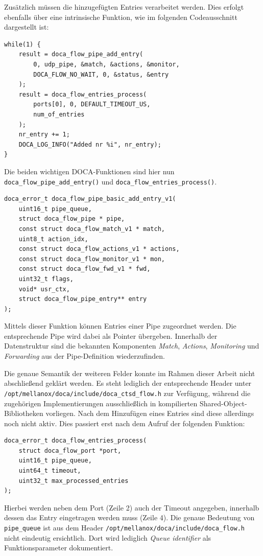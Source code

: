 \documentclass[paper=a4, fontsize=11pt]{scrartcl} %
\numberwithin{equation}{section} %
\numberwithin{figure}{section} %
\numberwithin{table}{section} %
\begin{document}
Zusätzlich müssen die hinzugefügten Entries verarbeitet werden. Dies erfolgt ebenfalls über eine intrinsische Funktion, wie im folgenden Codeausschnitt dargestellt ist:
\begin{verbatim}
while(1) {
    result = doca_flow_pipe_add_entry(
        0, udp_pipe, &match, &actions, &monitor, 
        DOCA_FLOW_NO_WAIT, 0, &status, &entry
    );
    result = doca_flow_entries_process(
        ports[0], 0, DEFAULT_TIMEOUT_US, 
        num_of_entries
    );
    nr_entry += 1;
    DOCA_LOG_INFO("Added nr %i", nr_entry);
}
\end{verbatim}
Die beiden wichtigen DOCA-Funktionen sind hier nun \texttt{doca\_flow\_pipe\_add\_entry()} und \texttt{doca\_flow\_entries\_process()}.
\begin{verbatim}
doca_error_t doca_flow_pipe_basic_add_entry_v1(
    uint16_t pipe_queue, 
    struct doca_flow_pipe * pipe, 
    const struct doca_flow_match_v1 * match, 
    uint8_t action_idx, 
    const struct doca_flow_actions_v1 * actions, 
    const struct doca_flow_monitor_v1 * mon, 
    const struct doca_flow_fwd_v1 * fwd, 
    uint32_t flags, 
    void* usr_ctx, 
    struct doca_flow_pipe_entry** entry
);
\end{verbatim}
Mittels dieser Funktion können Entries einer Pipe zugeordnet werden. Die entsprechende Pipe wird dabei als Pointer übergeben. Innerhalb der Datenstruktur sind die bekannten Komponenten \textit{Match}, \textit{Actions}, \textit{Monitoring} und \textit{Forwarding} aus der Pipe-Definition wiederzufinden.

Die genaue Semantik der weiteren Felder konnte im Rahmen dieser Arbeit nicht abschließend geklärt werden. Es steht lediglich der entsprechende Header unter \newline \texttt{/opt/mellanox/doca/include/doca\_ctsd\_flow.h} zur Verfügung, während die zugehörigen Implementierungen ausschließlich in kompilierten Shared-Object-Bibliotheken vorliegen.
\newpage
Nach dem Hinzufügen eines Entries sind diese allerdings noch nicht aktiv. Dies passiert erst nach dem Aufruf der folgenden Funktion:
\begin{verbatim}
doca_error_t doca_flow_entries_process(
    struct doca_flow_port *port,
    uint16_t pipe_queue,
    uint64_t timeout,
    uint32_t max_processed_entries
);
\end{verbatim}
Hierbei werden neben dem Port (Zeile 2) auch der Timeout angegeben, innerhalb dessen das Entry eingetragen werden muss (Zeile 4). Die genaue Bedeutung von \texttt{pipe\_queue} ist aus dem Header \texttt{/opt/mellanox/doca/include/doca\_flow.h} nicht eindeutig ersichtlich. Dort wird lediglich \textit{Queue identifier} als Funktionsparameter dokumentiert.
\end{document}
